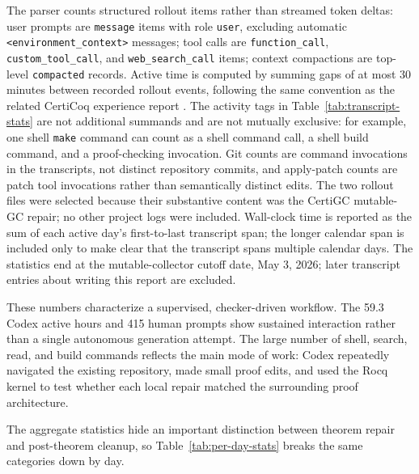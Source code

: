 \documentclass[acmsmall,nonacm]{acmart}
\newcommand{\Rocq}{Rocq}
\begin{document}
The parser counts structured rollout items rather than streamed token deltas:
user prompts are \texttt{message} items with role \texttt{user}, excluding
automatic \texttt{<environment\_context>} messages; tool calls are
\texttt{function\_call}, \texttt{custom\_tool\_call}, and
\texttt{web\_search\_call} items; context compactions are top-level
\texttt{compacted} records.  Active time is computed by summing gaps of at most
30 minutes between recorded rollout events, following the same convention as the
related CertiCoq experience report
\citep{paraskevopoulou2026machinegenerated}.  The activity tags in
Table~\ref{tab:transcript-stats} are not additional summands and are not
mutually exclusive: for example, one shell \texttt{make} command can count as a
shell command call, a shell build command, and a proof-checking invocation.  Git
counts are command invocations in the transcripts, not distinct repository
commits, and apply-patch counts are patch tool invocations rather than
semantically distinct edits.  The two rollout files were selected because their
substantive content was the CertiGC mutable-GC repair; no other project logs
were included.  Wall-clock time is reported as the sum of each active day's
first-to-last transcript span; the longer calendar span is included only to make
clear that the transcript spans multiple calendar days.  The statistics end at
the mutable-collector cutoff date, May 3, 2026; later transcript entries about
writing this report are excluded.

These numbers characterize a supervised, checker-driven workflow.  The 59.3
Codex active hours and 415 human prompts show sustained interaction rather than
a single autonomous generation attempt.  The large number of shell, search,
read, and build commands reflects the main mode of work: Codex repeatedly
navigated the existing repository, made small proof edits, and used the \Rocq{}
kernel to test whether each local repair matched the surrounding proof
architecture.

The aggregate statistics hide an important distinction between theorem repair
and post-theorem cleanup, so Table~\ref{tab:per-day-stats} breaks the same
categories down by day.
\end{document}
